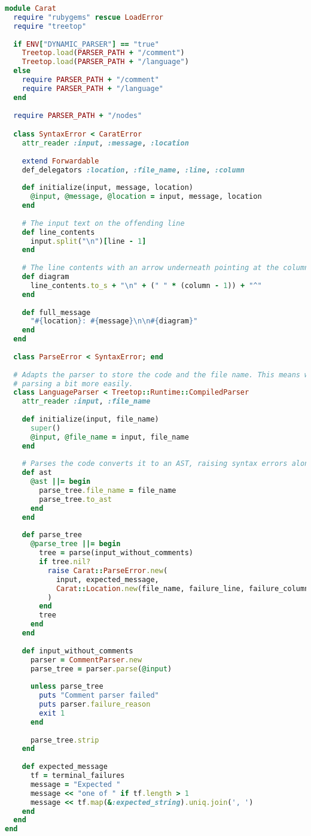 \begin{lstlisting}[title={\small\ttfamily\bfseries parser/parser.rb},language=Ruby]
module Carat
  require "rubygems" rescue LoadError
  require "treetop"
  
  if ENV["DYNAMIC_PARSER"] == "true"
    Treetop.load(PARSER_PATH + "/comment")
    Treetop.load(PARSER_PATH + "/language")
  else
    require PARSER_PATH + "/comment"
    require PARSER_PATH + "/language"
  end
  
  require PARSER_PATH + "/nodes"

  class SyntaxError < CaratError
    attr_reader :input, :message, :location
    
    extend Forwardable
    def_delegators :location, :file_name, :line, :column
    
    def initialize(input, message, location)
      @input, @message, @location = input, message, location
    end
    
    # The input text on the offending line
    def line_contents
      input.split("\n")[line - 1]
    end
    
    # The line contents with an arrow underneath pointing at the column
    def diagram
      line_contents.to_s + "\n" + (" " * (column - 1)) + "^"
    end
    
    def full_message
      "#{location}: #{message}\n\n#{diagram}"
    end
  end
  
  class ParseError < SyntaxError; end
  
  # Adapts the parser to store the code and the file name. This means we can break up the process of
  # parsing a bit more easily.
  class LanguageParser < Treetop::Runtime::CompiledParser
    attr_reader :input, :file_name
    
    def initialize(input, file_name)
      super()
      @input, @file_name = input, file_name
    end
    
    # Parses the code converts it to an AST, raising syntax errors along the way if necessary
    def ast
      @ast ||= begin
        parse_tree.file_name = file_name
        parse_tree.to_ast
      end
    end
    
    def parse_tree
      @parse_tree ||= begin
        tree = parse(input_without_comments)
        if tree.nil?
          raise Carat::ParseError.new(
            input, expected_message,
            Carat::Location.new(file_name, failure_line, failure_column)
          )
        end
        tree
      end
    end
    
    def input_without_comments
      parser = CommentParser.new
      parse_tree = parser.parse(@input)
      
      unless parse_tree
        puts "Comment parser failed"
        puts parser.failure_reason
        exit 1
      end
      
      parse_tree.strip
    end
    
    def expected_message
      tf = terminal_failures
      message = "Expected "
      message << "one of " if tf.length > 1
      message << tf.map(&:expected_string).uniq.join(', ')
    end
  end
end

\end{lstlisting}
